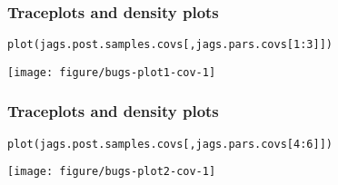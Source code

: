 \documentclass[color=usenames,dvipsnames]{beamer}\usepackage[]{graphicx}\usepackage[]{color}
\makeatletter
\newcommand{\hlnum}[1]{\textcolor[rgb]{0.69,0.494,0}{#1}}%
\newcommand{\hlopt}[1]{\textcolor[rgb]{0,0,0}{#1}}%
\newcommand{\hlstd}[1]{\textcolor[rgb]{0,0,0}{#1}}%
\newcommand{\hlkwd}[1]{\textcolor[rgb]{0.004,0.004,0.506}{#1}}%
\newenvironment{kframe}{%
 \def\at@end@of@kframe{}%
 \ifinner\ifhmode%
  \def\at@end@of@kframe{\end{minipage}}%
  \begin{minipage}{\columnwidth}%
 \fi\fi%
 \def\FrameCommand##1{\hskip\@totalleftmargin \hskip-\fboxsep
 \colorbox{shadecolor}{##1}\hskip-\fboxsep
     \hskip-\linewidth \hskip-\@totalleftmargin \hskip\columnwidth}%
 \MakeFramed {\advance\hsize-\width
   \@totalleftmargin\z@ \linewidth\hsize
   \@setminipage}}%
 {\par\unskip\endMakeFramed%
 \at@end@of@kframe}
\newenvironment{knitrout}{}{} %
\makeatother
\begin{document}
\begin{frame}[fragile]
  \frametitle{Traceplots and density plots}
\begin{knitrout}\footnotesize
{}\color{fgcolor}\begin{kframe}
\begin{alltt}
\hlkwd{plot}\hlstd{(jags.post.samples.covs[,jags.pars.covs[}\hlnum{1}\hlopt{:}\hlnum{3}\hlstd{]])}
\end{alltt}
\end{kframe}

{\centering \texttt{[image: figure/bugs-plot1-cov-1]} 

}



\end{knitrout}
\end{frame}




\begin{frame}[fragile]
  \frametitle{Traceplots and density plots}
\begin{knitrout}\footnotesize
{}\color{fgcolor}\begin{kframe}
\begin{alltt}
\hlkwd{plot}\hlstd{(jags.post.samples.covs[,jags.pars.covs[}\hlnum{4}\hlopt{:}\hlnum{6}\hlstd{]])}
\end{alltt}
\end{kframe}

{\centering \texttt{[image: figure/bugs-plot2-cov-1]} 

}



\end{knitrout}
\end{frame}
\end{document}

